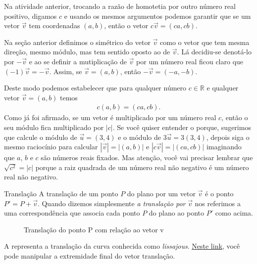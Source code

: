 Na atividade anterior, trocando a razão de homotetia por outro número real positivo, digamos \(c\) e usando os mesmos argumentos podemos garantir que se um vetor \(\vec{v}\) tem coordenadas \((a,b)\), então o vetor \(c\vec{v}=(ca,cb)\).

Na seção anterior definimos o simétrico do vetor \(\vec{v}\) como o vetor que tem mesma direção, mesmo módulo, mas tem sentido oposto ao de \(\vec{v}\).
Lá decidiu-se denotá-lo por \(-\vec{v}\) e ao se definir a mutiplicação de \(\vec{v}\) por um número real ficou claro que \((-1)\vec{v}=-\vec{v}\).
Assim, se \(\vec{v}=(a,b)\), então \(-\vec{v} = (-a,-b)\).

Deste modo podemos estabelecer que para qualquer número \(c \in \mathbb{R}\) e qualquer vetor \(\vec{v}=(a,b)\) temos
\begin{equation*}
\begin{split}c(a,b)=(ca,cb).\end{split}
\end{equation*}
Como já foi afirmado, se um vetor é multiplicado por um número real \(c\), então o seu módulo fica multiplicado por \(|c|\). Se você quiser entender o porque, sugerimos que calcule o módulo de \(\vec{u}=(3,4)\) e o módulo de \(3\vec{u}=3(3,4)\), depois siga o mesmo raciocínio para calcular \(|\vec{v}|=|(a,b)|\) e \(|c\vec{v}|=|(ca,cb)|\) imaginando que \(a\), \(b\) e \(c\) são números reais fixados. Mas atenção, você vai precisar lembrar que \(\sqrt{c^2}=|c|\) porque a raiz quadrada de um número real não negativo é um número real não negativo.
\begin{observationtitle}{Translação}
A translação de um ponto \(P\) do plano por um vetor \(\vec{v}\) é o ponto \(P'=P+\vec{v}\). Quando dizemos simplesmente \textit{a translação por} \(\vec{v}\) nos referimos a uma correspondência que associa cada ponto \(P\) do plano ao ponto \(P'\) como acima.

\begin{figure}[H]
\centering

\caption{Translação do ponto P com relação ao vetor v}
\end{figure}
\end{observationtitle}

A  representa a translação da curva conhecida como \textit{lissajous}. \href{https://www.geogebra.org/m/bWpc8guU}{Neste link}, você pode manipular a extremidade final do vetor translação.

